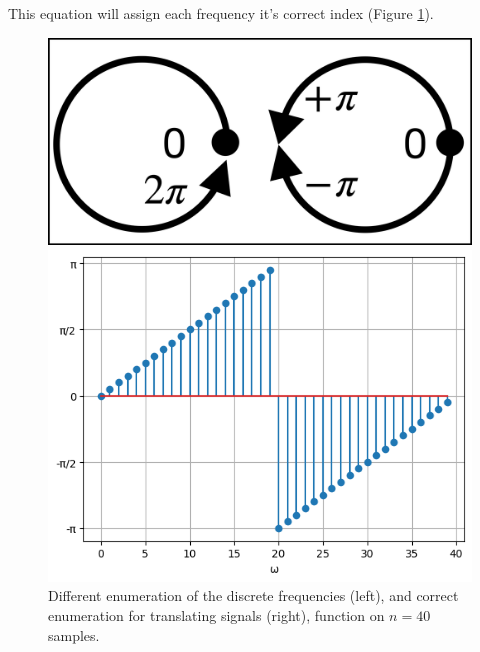 \documentclass[]{usiinfbachelorproject}
\begin{document}
		This equation will assign each frequency it's correct index (Figure \ref{fig:wavenum_plot}).
		\begin{figure}
			\centering
			\hfill
			\parbox{0.4\linewidth}{\centering
				\includegraphics[width=\linewidth]{images/freq_index_circle.png}
			}\hfill
			\parbox{0.48\linewidth}{\centering
				\includegraphics[width=\linewidth]{images/wavenum_40.png}
			}\hfill
			\caption{Different enumeration of the discrete frequencies (left), and correct enumeration for translating signals (right), function on $n=40$ samples.}
			\label{fig:wavenum_plot}
		\end{figure}
		
\end{document}
